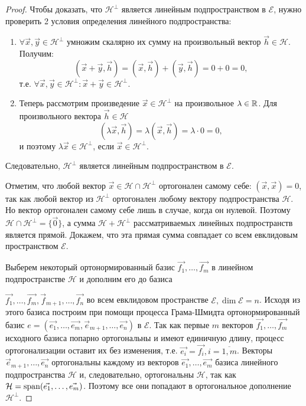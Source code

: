 \begin{proof}
    Чтобы доказать, что $\mathcal{H}^\perp$ является линейным подпространством в $\mathcal{E}$, нужно проверить 2 условия определения линейного подпространства:
    \begin{enumerate}
        \item $\forall \vec{x}, \vec{y} \in \mathcal{H}^\perp$ умножим скалярно их сумму на произвольный вектор $\vec{h} \in \mathcal{H}$. Получим:
        $$(\vec{x} + \vec{y}, \vec{h}) = (\vec{x}, \vec{h}) + (\vec{y}, \vec{h}) = 0 + 0 = 0,$$
        т.е. $\forall \vec{x}, \vec{y} \in \mathcal{H}^\perp \colon \vec{x} + \vec{y} \in \mathcal{H}^\perp$. 
        \item Теперь рассмотрим произведение $\vec{x} \in \mathcal{H}^\perp$ на произвольное $\lambda \in \mathbb{R}$. Для произвольного вектора $\vec{h} \in \mathcal{H}$
        $$(\lambda \vec{x}, \vec{h}) = \lambda(\vec{x}, \vec{h}) = \lambda \cdot 0 = 0,$$
        и поэтому $\lambda \vec{x} \in \mathcal{H}^\perp$, если $\vec{x} \in \mathcal{H}^\perp$.
    \end{enumerate}
    Следовательно, $\mathcal{H}^\perp$ является линейным подпространством в $\mathcal{E}$.

    Отметим, что любой вектор $\vec{x} \in \mathcal{H} \cap \mathcal{H}^\perp$ ортогонален самому себе: $(\vec{x}, \vec{x}) = 0$, так как любой вектор из $\mathcal{H}^\perp$ ортогонален любому вектору подпространства $\mathcal{H}$. Но вектор ортогонален самому себе лишь в случае, когда он нулевой. Поэтому $\mathcal{H} \cap \mathcal{H}^\perp = \{\vec{0}\}$, а сумма $\mathcal{H} + \mathcal{H}^\perp$ рассматриваемых линейных подпространств является прямой. Докажем, что эта прямая сумма совпадает со всем евклидовым пространством $\mathcal{E}$.

    Выберем некоторый ортонормированный базис $\vec{f_1}, \ldots, \vec{f_m}$ в линейном подпространстве $\mathcal{H}$ и дополним его до базиса 
    
    $\vec{f_1}, \ldots, \vec{f_m}, \vec{f}_{m + 1}, \ldots, \vec{f_n}$ во всем евклидовом пространстве $\mathcal{E}, \dim \mathcal{E} = n$. Исходя из этого базиса построим при помощи процесса Грама-Шмидта ортонормированный базис $e = (\vec{e_1}, \ldots, \vec{e_m}, \vec{e}_{m + 1}, \ldots, \vec{e_n})$ в $\mathcal{E}$. Так как первые $m$ векторов $\vec{f_1}, \ldots, \vec{f_m}$ исходного базиса попарно ортогональны и имеют единичную длину, процесс ортогонализации оставит их без изменения, т.е. $\vec{e_i} = \vec{f_i}, i = \overline{1, m}$. Векторы $\vec{e}_{m + 1}, \ldots, \vec{e_n}$ ортогональны каждому из векторов $\vec{e_1}, \ldots, \vec{e_m}$ базиса линейного подпространства $\mathcal{H}$ и, следовательно, ортогональны $\mathcal{H}$, так как $\mathcal{H} = \operatorname{\mathop{\mathrm{span}}}(\vec{e_1}, \ldots, \vec{e_m})$. Поэтому все они попадают в ортогональное дополнение $\mathcal{H}^\perp$.


\end{proof}
